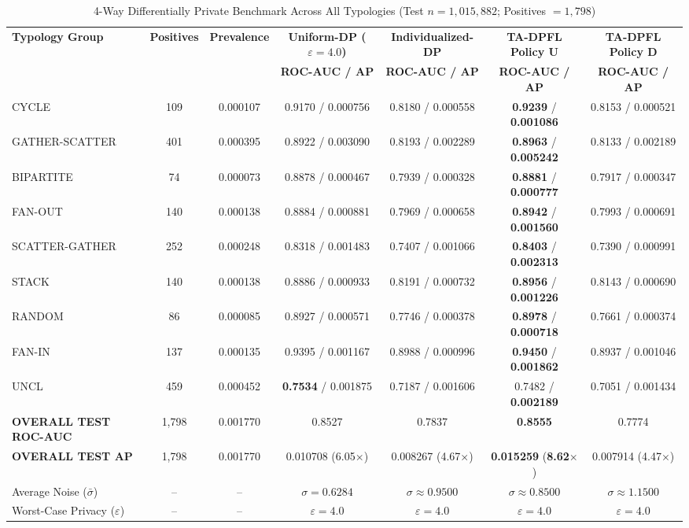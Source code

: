 \documentclass[conference]{IEEEtran}
\begin{document}
\begin{table}[t]
\centering
\caption{4-Way Differentially Private Benchmark Across All Typologies (Test $n = 1,015,882$; Positives $= 1,798$)}
\label{tab:four_way_results}
\begin{tabular}{lcccccc}
\toprule
\textbf{Typology Group} & \textbf{Positives} & \textbf{Prevalence} & \textbf{Uniform-DP ($\varepsilon=4.0$)} & \textbf{Individualized-DP} & \textbf{TA-DPFL Policy U} & \textbf{TA-DPFL Policy D} \\
 & & & \textbf{ROC-AUC / AP} & \textbf{ROC-AUC / AP} & \textbf{ROC-AUC / AP} & \textbf{ROC-AUC / AP} \\
\midrule
CYCLE & 109 & 0.000107 & 0.9170 / 0.000756 & 0.8180 / 0.000558 & \textbf{0.9239} / \textbf{0.001086} & 0.8153 / 0.000521 \\
GATHER-SCATTER & 401 & 0.000395 & 0.8922 / 0.003090 & 0.8193 / 0.002289 & \textbf{0.8963} / \textbf{0.005242} & 0.8133 / 0.002189 \\
BIPARTITE & 74 & 0.000073 & 0.8878 / 0.000467 & 0.7939 / 0.000328 & \textbf{0.8881} / \textbf{0.000777} & 0.7917 / 0.000347 \\
FAN-OUT & 140 & 0.000138 & 0.8884 / 0.000881 & 0.7969 / 0.000658 & \textbf{0.8942} / \textbf{0.001560} & 0.7993 / 0.000691 \\
SCATTER-GATHER & 252 & 0.000248 & 0.8318 / 0.001483 & 0.7407 / 0.001066 & \textbf{0.8403} / \textbf{0.002313} & 0.7390 / 0.000991 \\
STACK & 140 & 0.000138 & 0.8886 / 0.000933 & 0.8191 / 0.000732 & \textbf{0.8956} / \textbf{0.001226} & 0.8143 / 0.000690 \\
RANDOM & 86 & 0.000085 & 0.8927 / 0.000571 & 0.7746 / 0.000378 & \textbf{0.8978} / \textbf{0.000718} & 0.7661 / 0.000374 \\
FAN-IN & 137 & 0.000135 & 0.9395 / 0.001167 & 0.8988 / 0.000996 & \textbf{0.9450} / \textbf{0.001862} & 0.8937 / 0.001046 \\
UNCL & 459 & 0.000452 & \textbf{0.7534} / 0.001875 & 0.7187 / 0.001606 & 0.7482 / \textbf{0.002189} & 0.7051 / 0.001434 \\
\midrule
\textbf{OVERALL TEST ROC-AUC} & 1,798 & 0.001770 & 0.8527 & 0.7837 & \textbf{0.8555} & 0.7774 \\
\textbf{OVERALL TEST AP} & 1,798 & 0.001770 & 0.010708 (6.05$\times$) & 0.008267 (4.67$\times$) & \textbf{0.015259} (\textbf{8.62$\times$}) & 0.007914 (4.47$\times$) \\
Average Noise ($\bar{\sigma}$) & -- & -- & $\sigma = 0.6284$ & $\sigma \approx 0.9500$ & $\sigma \approx 0.8500$ & $\sigma \approx 1.1500$ \\
Worst-Case Privacy ($\varepsilon$) & -- & -- & $\varepsilon = 4.0$ & $\varepsilon = 4.0$ & $\varepsilon = 4.0$ & $\varepsilon = 4.0$ \\
\bottomrule
\end{tabular}
\end{table}
\end{document}
